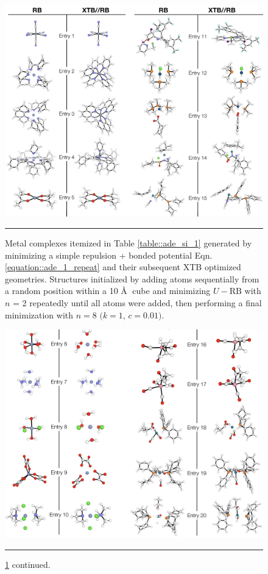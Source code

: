 \documentclass[../../main.tex]{subfiles}
\begin{document}
\begin{figure}[h!]
	\vspace{0.4cm}
	\centering
	\includegraphics[width=\textwidth]{5/autode/figs/figS5a}
	\vspace{0.4cm}
	\hrule
	\caption{Metal complexes itemized in Table \ref{table::ade_si_1} generated by minimizing a simple repulsion + bonded potential Eqn. \eqref{equation::ade_1_repeat} and their subsequent XTB optimized geometries. Structures initialized by adding atoms sequentially from a random position within a 10 \AA$\;$ cube and minimizing $U-\text{RB}$ with $n$ = 2 repeatedly until all atoms were added, then performing a final minimization with $n = 8$ $(k = 1$, $c = 0.01)$.}
	\label{fig::ade_si_5a}
\end{figure}


\begin{figure}[h!]
	\vspace{0.4cm}
	\centering
	\includegraphics[width=\textwidth]{5/autode/figs/figS5b}
	\vspace{0.4cm}
	\hrule
	\caption{\figurename{ }\ref{fig::ade_si_5a} continued.}
	\label{fig::ade_si_5b}
\end{figure}
\end{document}
